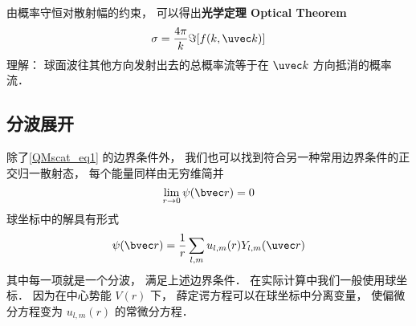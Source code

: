 由概率守恒对散射幅的约束， 可以得出\textbf{光学定理 Optical Theorem}
\begin{equation}
\sigma = \frac{4\pi}{k} \Im[f(k, \uvec k)]
\end{equation}
理解： 球面波往其他方向发射出去的总概率流等于在 $\uvec k$ 方向抵消的概率流．

\subsection{分波展开}
除了\autoref{QMscat_eq1} 的边界条件外， 我们也可以找到符合另一种常用边界条件的正交归一散射态， 每个能量同样由无穷维简并
\begin{equation}
\lim_{r\to 0} \psi(\bvec r) = 0
\end{equation}
球坐标中的解具有形式
\begin{equation}
\psi(\bvec r) = \frac{1}{r} \sum_{l,m} u_{l,m}(r) Y_{l,m}(\uvec r)
\end{equation}
其中每一项就是一个分波， 满足上述边界条件． 在实际计算中我们一般使用球坐标． 因为在中心势能 $V(r)$ 下， 薛定谔方程可以在球坐标中分离变量， 使偏微分方程变为 $u_{l,m}(r)$ 的常微分方程．

